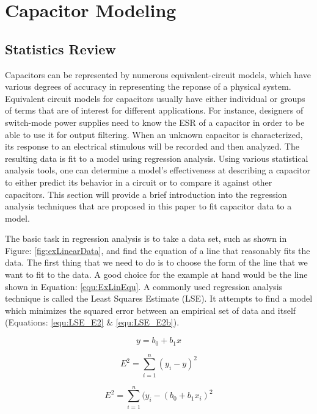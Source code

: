 \section {Capacitor Modeling}
\subsection{Statistics Review}
Capacitors can be represented by numerous equivalent-circuit models, which have various degrees of accuracy in representing the reponse of a physical system. Equivalent circuit models for capacitors usually have either individual or groups of terms that are  of interest for different applications. For instance, designers of switch-mode power supplies need to know the ESR of a capacitor in order to be able to use it for output filtering. When an unknown capacitor is characterized, its response to an electrical stimulous will be recorded and then analyzed. The resulting data is fit to a model using regression analysis. Using various statistical analysis tools, one can determine a model's effectiveness at describing a capacitor to either predict its behavior in a circuit or to compare it against other capacitors. This section will provide a brief introduction into the regression analysis techniques that are proposed in this paper to fit capacitor data to a model.



The basic task in regression analysis is to take a data set, such as shown in Figure: \ref{fig:exLinearData}, and find the equation of a line that reasonably fits the data. The first thing that we need to do is to choose the form of the line that we want to fit to the data. A good choice for the example at hand would be the line shown in Equation: \eqref{equ:ExLinEqu}. A commonly used regression analysis technique is called the Least Squares Estimate (LSE). It attempts to find a model which minimizes the squared error between an empirical set of data and itself (Equations: \eqref{equ:LSE_E2} \& \eqref{equ:LSE_E2b}).

\begin{equation}
\label{equ:ExLinEqu}
y = b_0 + b_1 x
\end{equation}

\begin{equation}
\label{equ:LSE_E2}
E^2 = \sum_{i=1}^{n} (y_i - y)^2
\end{equation}

\begin{equation}
\label{equ:LSE_E2b}
E^2 = \sum_{i=1}^{n} (y_i - (b_0 + b_1 x_i)^2
\end{equation}

